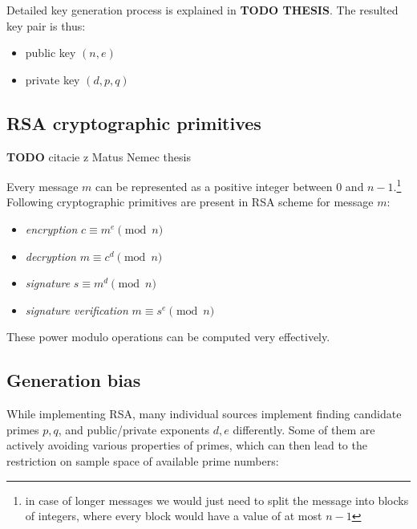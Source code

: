 Detailed key generation process is explained in \textbf{TODO THESIS}. The resulted key pair is thus:

\begin{itemize}

\item public key $(n, e)$

\item private key $(d, p, q)$

\end{itemize}

\subsection*{RSA cryptographic primitives}

\textbf{TODO } citacie z Matus Nemec thesis

Every message $m$ can be represented as a positive integer between 0 and $n-1$.\footnote{in case of longer messages we would just need to split the message into blocks of integers, where every block would have a value of at most $n-1$} Following cryptographic primitives are present in RSA scheme for message $m$:

\begin{itemize}

\item \textit{encryption} $c \equiv m^e \pmod{n}$
\item \textit{decryption} $m \equiv c^d \pmod{n}$
\item \textit{signature} $s \equiv m^d \pmod{n}$
\item \textit{signature verification} $m \equiv s^e \pmod{n}$

\end{itemize}

These power modulo operations can be computed very effectively.

\subsection{Generation bias}

While implementing RSA, many individual sources implement finding candidate primes $p,q$, and public/private exponents $d,e$ differently. Some of them are actively avoiding various properties of primes, which can then lead to the restriction on sample space of available prime numbers:

